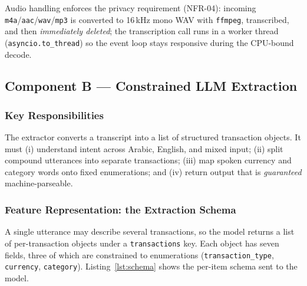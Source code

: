Audio handling enforces the privacy requirement (NFR-04): incoming
\texttt{m4a}/\texttt{aac}/\texttt{wav}/\texttt{mp3} is converted to 16\,kHz mono
WAV with \texttt{ffmpeg}, transcribed, and then \emph{immediately deleted}; the
transcription call runs in a worker thread (\texttt{asyncio.to\_thread}) so the
event loop stays responsive during the CPU-bound decode.

\subsection{Component B --- Constrained LLM Extraction}
\label{sec:ch4-extraction}

\subsubsection{Key Responsibilities}

The extractor converts a transcript into a list of structured transaction
objects. It must (i) understand intent across Arabic, English, and mixed input;
(ii) split compound utterances into separate transactions; (iii) map spoken
currency and category words onto fixed enumerations; and (iv) return output that
is \emph{guaranteed} machine-parseable.

\subsubsection{Feature Representation: the Extraction Schema}
\label{sec:ch4-schema}

A single utterance may describe several transactions, so the model returns a
list of per-transaction objects under a \texttt{transactions} key. Each object
has seven fields, three of which are constrained to enumerations
(\texttt{transaction\_type}, \texttt{currency}, \texttt{category}).
Listing~\ref{lst:schema} shows the per-item schema sent to the model.


